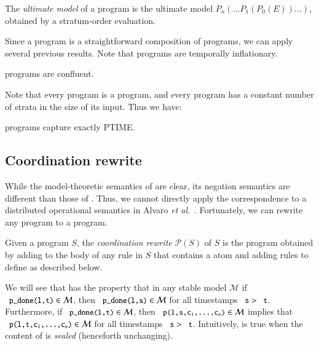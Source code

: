 The {\em ultimate model} of a \plang program is the ultimate model $P_n(\ldots P_1(P_0(E)) \ldots )$, obtained by a stratum-order evaluation.


Since a \plang program is a straightforward composition of \slang programs, we can apply several previous results.  Note that \plang programs are temporally inflationary.

\begin{corollary}
\label{cor:plang-confluent}
\plang programs are confluent.
\end{corollary}

Note that every \slang program is a \plang program, and every \plang program has a constant number of strata in the size of its input.  Thus we have:

\begin{corollary}
\label{cor:plang-ptime}
\plang programs capture exactly PTIME.
\end{corollary}


\subsection{Coordination rewrite}
\label{sec:coordination}

While the model-theoretic semantics of \plang are clear, its negation
semantics are different than those of \lang.  Thus, we cannot directly apply the
correspondence to a distributed operational semantics in Alvaro \emph{et
  al}.~\cite{ameloot-operational}.  Fortunately, we can rewrite any \plang
program to a \lang program.

Given a \plang program $S$, the {\em coordination rewrite} $\mathcal{P}(S)$ of $S$ is
the \lang program obtained by adding  to the body of any rule
in $S$ that contains a  atom and adding rules to define
 as described below.

We will see that  has the
property that in any stable model $\mathcal{M}$ if $\dedalus{p_done(l,t)} \in
\mathcal{M}$, then $\dedalus{p_done(l,s)} \in \mathcal{M}$ for all timestamps
$\dedalus{s} > \dedalus{t}$.  Furthermore, if $\dedalus{p_done(l,t)} \in
\mathcal{M}$, then $\dedalus{p(l,s,c\sub{1},\ldots,c\sub{n})} \in \mathcal{M}$
implies that $\dedalus{p(l,t,c\sub{1},\ldots,c\sub{n})} \in \mathcal{M}$ for all
timestamps $\dedalus{s} > \dedalus{t}$.  Intuitively,  is true
when the content of  is {\em sealed} (henceforth unchanging).

